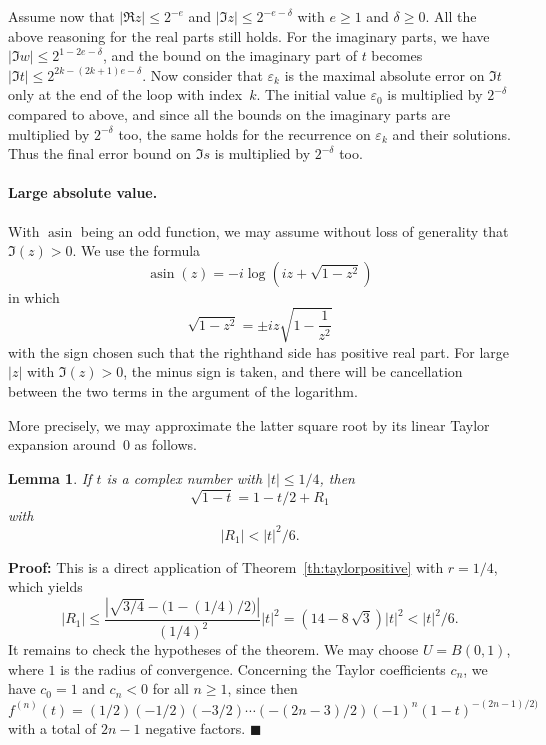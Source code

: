 \documentclass [11pt]{article}
\newcommand {\asin}{\operatorname {asin}}
\renewcommand {\leq}{\leqslant}
\renewcommand {\geq}{\geqslant}
\newtheorem{lemma}[theorem]{Lemma}
\newenvironment{proof}{\noindent \textbf {Proof:}}{{\hspace* {\fill}$\blacksquare$}}
\begin{document}
Assume now that $|\Re z| \leq 2^{-e}$ and $|\Im z| \leq 2^{-e-\delta}$ with
$e \geq 1$ and $\delta \geq 0$. All the above reasoning for the real parts still
holds. For the imaginary parts, we have
$|\Im w| \leq 2^{1-2e-\delta}$, and the bound on the imaginary part of $t$
becomes $|\Im t| \leq 2^{2k-(2k+1)e-\delta}$.
Now consider that $\varepsilon_k$ is the maximal absolute error on
$\Im t$ only at the end of the loop with index~$k$.
The initial value $\varepsilon_0$
is multiplied by $2^{-\delta}$ compared to above,
and since all the bounds on the imaginary
parts are multiplied by $2^{-\delta}$ too, the same holds for the recurrence
on $\varepsilon_k$ and their solutions. Thus the final error bound on
$\Im s$ is multiplied by $2^{-\delta}$ too.

\paragraph {Large absolute value.}
With $\asin$ being an odd function, we may assume without loss of generality
that $\Im (z) > 0$.
We use the formula
\[
\asin (z) = -i \log \left( i z + \sqrt {1-z^2} \right)
\]
in which
\[
\sqrt {1 - z^2} = \pm i z \sqrt {1 - \frac {1}{z^2}}
\]
with the sign chosen such that the righthand side has positive real part.
For large $|z|$ with $\Im (z) > 0$, the minus sign is taken, and there
will be cancellation between the two terms in the argument of the
logarithm.

More precisely, we may approximate the latter square root by its
linear Taylor expansion around~$0$ as follows.

\begin {lemma}
\label {lm:sqrttaylor}
If $t$ is a complex number with $|t| \leq 1/4$, then
\[
\sqrt {1 - t} = 1 - t / 2 + R_1
\]
with
\[
|R_1| < |t|^2 / 6.
\]
\end {lemma}

\begin {proof}
This is a direct application of Theorem~\ref {th:taylorpositive}
with $r = 1 / 4$, which yields
\[
|R_1| \leq \frac {\left| \sqrt {3/4} - \big( 1 - (1/4) / 2 \big) \right|}
                 {(1/4)^2}
           |t|^2
      =    \left( 14 - 8 \, \sqrt {3} \right) |t|^2
      <    |t|^2 / 6.
\]
It remains to check the hypotheses of the theorem.
We may choose $U = B (0, 1)$, where $1$ is the radius of convergence.
Concerning the Taylor coefficients $c_n$, we have $c_0 = 1$ and $c_n < 0$
for all $n \geq 1$, since then
$f^{(n)} (t) = (1/2)(-1/2)(-3/2)\cdots(-(2n-3)/2)
               (-1)^n (1-t)^{-(2n-1)/2)}$
with a total of $2n - 1$ negative factors.
\end {proof}
\end{document}
